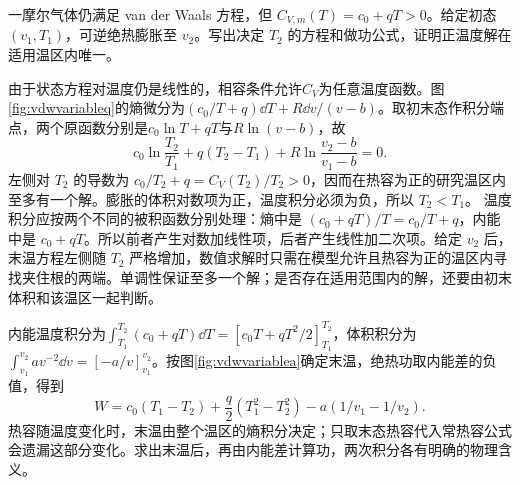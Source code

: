 \begin{example}[实际气体温变热容的绝热线]
一摩尔气体仍满足 van der Waals 方程，但 $C_{V,m}(T)=c_0+qT>0$。给定初态 $(v_1,T_1)$，可逆绝热膨胀至 $v_2$。写出决定 $T_2$ 的方程和做功公式，证明正温度解在适用温区内唯一。
\end{example}
\begin{solution}
由于状态方程对温度仍是线性的，相容条件允许$C_V$为任意温度函数。图\ref{fig:vdwvariableq}的熵微分为$(c_0/T+q)\dd T+R\dd v/(v-b)$。取初末态作积分端点，两个原函数分别是$c_0\ln T+qT$与$R\ln(v-b)$，故
\[
 c_0\ln\frac{T_2}{T_1}+q(T_2-T_1)
 +R\ln\frac{v_2-b}{v_1-b}=0.
\]
左侧对 $T_2$ 的导数为 $c_0/T_2+q=C_V(T_2)/T_2>0$，因而在热容为正的研究温区内至多有一个解。膨胀的体积对数项为正，温度积分必须为负，所以 $T_2<T_1$。
温度积分应按两个不同的被积函数分别处理：熵中是 $(c_0+qT)/T=c_0/T+q$，内能中是 $c_0+qT$。所以前者产生对数加线性项，后者产生线性加二次项。给定 $v_2$ 后，末温方程左侧随 $T_2$ 严格增加，数值求解时只需在模型允许且热容为正的温区内寻找夹住根的两端。单调性保证至多一个解；是否存在适用范围内的解，还要由初末体积和该温区一起判断。

内能温度积分为$\int_{T_1}^{T_2}(c_0+qT)\dd T=[c_0T+qT^2/2]_{T_1}^{T_2}$，体积积分为$\int_{v_1}^{v_2}av^{-2}\dd v=[-a/v]_{v_1}^{v_2}$。按图\ref{fig:vdwvariablea}确定末温，绝热功取内能差的负值，得到
\[
 W=c_0(T_1-T_2)+\frac q2(T_1^2-T_2^2)-a(1/v_1-1/v_2).
\]
热容随温度变化时，末温由整个温区的熵积分决定；只取末态热容代入常热容公式会遗漏这部分变化。求出末温后，再由内能差计算功，两次积分各有明确的物理含义。
\end{solution}

